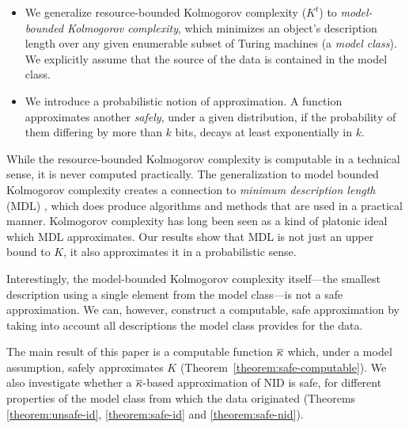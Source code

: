\begin{itemize}
\item We generalize resource-bounded Kolmogorov complexity ($K^t$) to \emph{model-\\bounded Kolmogorov complexity}, which minimizes an object's description length over any given enumerable subset of Turing machines (a \emph{model class}). We explicitly assume that the source of the data is contained in the model class. 
\item We introduce a probabilistic notion of approximation. A function approximates another \emph{safely}, under a given distribution, if the probability of them differing by more than $k$ bits, decays at least exponentially in $k$. \footnotemark
\end{itemize}



\noindent While the resource-bounded Kolmogorov complexity is computable in a technical sense, it is never computed practically. The generalization to model bounded Kolmogorov complexity creates a connection to \emph{minimum description length} (MDL) \cite{rissanen1978modeling,DBLP:journals/tit/Rissanen84,grunwald2007minimum}, which does produce algorithms and methods that are used in a practical manner. Kolmogorov complexity has long been seen as a kind of platonic ideal which MDL approximates. Our results show that MDL is not just an upper bound to $K$, it also approximates it in a probabilistic sense.


Interestingly, the model-bounded Kolmogorov complexity itself---the smallest description using a single element from the model class---is not a safe approximation. We can, however, construct a computable, safe approximation by taking into account all descriptions the model class provides for the data.

The main result of this paper is a computable function ${\overline{\kappa}}$ which, under a model assumption, safely approximates $K$ (Theorem~\ref{theorem:safe-computable}). We also investigate whether a ${\overline{\kappa}}$-based approximation of NID is safe, for different properties of the model class from which the data originated (Theorems \ref{theorem:unsafe-id}, \ref{theorem:safe-id} and \ref{theorem:safe-nid}).


